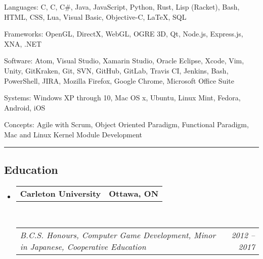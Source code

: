 \documentclass[10pt,letterpaper]{article}
\makeatletter
\newenvironment{indentsection}[1]%
{\begin{list}{}%
  {\setlength{\leftmargin}{#1}}%
  \item[]%
}
{\end{list}}
\newcommand{\headerrow}[2]
{\begin{tabular*}{\linewidth}{l@{\extracolsep{\fill}}r}
  #1 &
  #2 \\
\end{tabular*}}
\newcommand{\CPP}
{C\nolinebreak[4]\hspace{-.05em}\raisebox{.22ex}{\footnotesize\bf ++}}
\makeatother
\begin{document}
\begin{indentsection}{\parindent}
\begin{description*}
  \item[Languages:]
  C, \CPP, C\#, Java, JavaScript, Python, Rust, Lisp (Racket), Bash, HTML, CSS,
  Lua, Visual Basic, Objective-C, \LaTeX, SQL
  \\
  \item[Frameworks:]
  OpenGL, DirectX, WebGL, OGRE 3D, Qt, Node.js, Express.js, XNA, .NET
  \\
  \item[Software:]
  Atom, Visual Studio, Xamarin Studio, Oracle Eclipse, Xcode, Vim, Unity,
  GitKraken, Git, SVN, GitHub, GitLab, Travis CI, Jenkins, Bash, PowerShell,
  JIRA, Mozilla Firefox, Google Chrome, Microsoft Office Suite
  \\
  \item[Systems:]
  Windows XP through 10, Mac OS x, Ubuntu, Linux Mint, Fedora, Android, iOS
  \\
  \item[Concepts:]
  Agile with Scrum, Object Oriented Paradigm, Functional Paradigm, Mac and Linux
  Kernel Module Development
\end{description*}
\end{indentsection}

\hrule
\vspace{-0.4em}
\subsection*{Education}

\begin{itemize}
  \parskip=0.1em

  \item
  \headerrow
    {\textbf{Carleton University}}
    {\textbf{Ottawa, ON}}
  \\
  \headerrow
    {\emph{B.C.S. Honours, Computer Game Development, Minor in Japanese, Cooperative Education}}
    {\emph{2012 -- 2017}}

\end{itemize}
\end{document}
